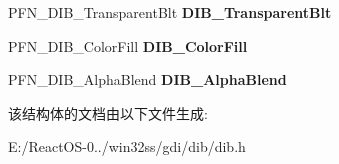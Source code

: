 \begin{DoxyCompactItemize}
\item 
\mbox{\label{struct_d_i_b___f_u_n_c_t_i_o_n_s_ac8738f57595f86a6401ffd418a2d97f2}} 
P\+F\+N\+\_\+\+D\+I\+B\+\_\+\+Transparent\+Blt {\bfseries D\+I\+B\+\_\+\+Transparent\+Blt}
\item 
\mbox{\label{struct_d_i_b___f_u_n_c_t_i_o_n_s_aebdee9a280761487c1e7041f20748f25}} 
P\+F\+N\+\_\+\+D\+I\+B\+\_\+\+Color\+Fill {\bfseries D\+I\+B\+\_\+\+Color\+Fill}
\item 
\mbox{\label{struct_d_i_b___f_u_n_c_t_i_o_n_s_ae7e8fe697c64ad8987f34e6162d05dcf}} 
P\+F\+N\+\_\+\+D\+I\+B\+\_\+\+Alpha\+Blend {\bfseries D\+I\+B\+\_\+\+Alpha\+Blend}
\end{DoxyCompactItemize}


该结构体的文档由以下文件生成\+:\begin{DoxyCompactItemize}
\item 
E\+:/\+React\+O\+S-\/0../win32ss/gdi/dib/dib.\+h\end{DoxyCompactItemize}
